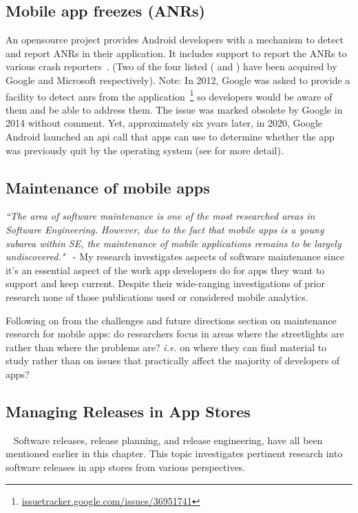 \subsection{Mobile app freezes (ANRs)}
An opensource project provides Android developers with a mechanism to detect and report ANRs in their application. It includes support to report the ANRs to various crash reporters~\cite{salomonbrys_github_anr_watchdog}. (Two of the four listed ( and ) have been acquired by Google and Microsoft respectively). Note: In 2012, Google was asked to provide a facility to detect \Glspl{anr} 
from the application~\footnote{\href{https://issuetracker.google.com/issues/36951741}{issuetracker.google.com/issues/36951741}} so developers would be aware of them and be able to address them. The issue was marked obsolete by Google in 2014 without comment. Yet, approximately six years later, in 2020, Google Android launched an \Gls{api} 
call that apps can use to determine whether the app was previously quit by the operating system (see  for more detail). 


\subsection{Maintenance of mobile apps}
\emph{``The area of software maintenance is one of the most researched areas in Software Engineering. However, due to the fact that mobile apps is a young subarea within SE, the maintenance of mobile applications remains to be largely undiscovered."}~\cite[p. 27]{nagappan2016_future_trends_in_sw_eng_for_mobile_apps} - My research investigates aspects of software maintenance since it's an essential aspect of the work app developers do for apps they want to support and keep current. Despite their wide-ranging investigations of prior research none of those publications used or considered mobile analytics. 

Following on from the challenges and future directions section on maintenance research for mobile apps: do researchers focus in areas where the streetlights are rather than where the problems are? \emph{i.e.} on where they can find material to study rather than on issues that practically affect the majority of developers of apps?


\subsection{Managing Releases in App Stores}~\label{rw-managing-releases-in-app-stores-topic}
Software releases, release planning, and release engineering, have all been mentioned earlier in this chapter. This topic investigates pertinent research into software releases in app stores from various perspectives.

